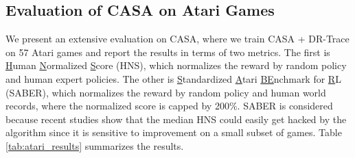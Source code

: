 


\subsection{Evaluation of CASA on Atari Games}
\label{sec:atari_results}


We present an extensive evaluation on CASA, where we train CASA + DR-Trace on 57 Atari games and report the results in terms of two metrics. 
The first is \underline{H}uman \underline{N}ormalized \underline{S}core (HNS), which normalizes the reward by random policy and human expert policies. 
The other is \underline{S}tandardized \underline{A}tari \underline{BE}nchmark for \underline{R}L (SABER), which  normalizes the reward by random policy and human world records, where the normalized score is capped by 200$\%$. 
SABER is considered because recent studies show that the median HNS could easily get hacked by the algorithm since it is sensitive to improvement  on a small subset of games. 
Table \ref{tab:atari_results} summarizes the results.


